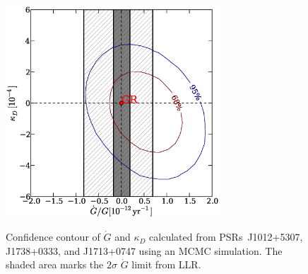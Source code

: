 \documentclass[12pt,preprint]{aastex}
\begin{document}

\begin{figure}
\includegraphics[width=8cm]{finalGdot.ps} \\ 
\caption {\label{fig:Gdot} Confidence contour of $\dot{G}$ and $\kappa_D$
calculated from PSRs~J1012+5307, J1738+0333, and J1713+0747 using an MCMC simulation.
The shaded area marks the 2$\sigma$ $\dot{G}$ limit from LLR. 
} 
\end{figure} 







\end{document}
